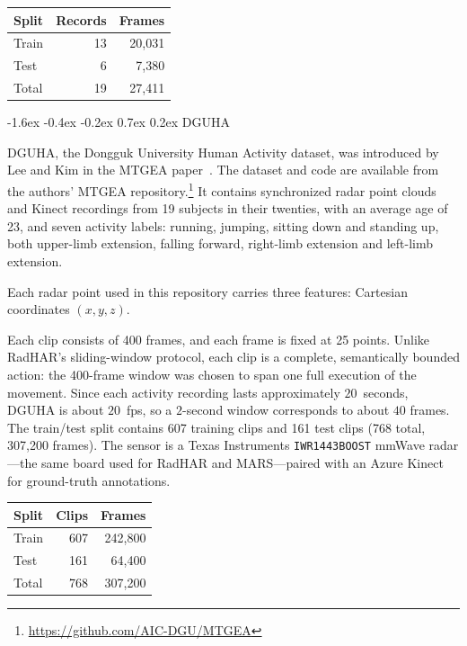 \documentclass[10pt,twocolumn]{article}
\makeatletter
\renewcommand{\subsection}{%
  \@startsection{subsection}{2}{\z@}%
  {-1.6ex \@plus -0.4ex \@minus -0.2ex}%
  {0.7ex \@plus 0.2ex}%
  {\normalfont\normalsize\bfseries}}
\makeatother
\begin{document}
\begin{center}
\begin{tabular}{lrr}
\toprule
Split & Records & Frames \\
\midrule
Train & 13 & 20,031 \\
Test & 6 & 7,380 \\
Total & 19 & 27,411 \\
\bottomrule
\end{tabular}
\end{center}

\subsection{DGUHA}
\label{sec:dguha}

DGUHA, the Dongguk University Human Activity dataset, was introduced by Lee and
Kim in the MTGEA paper~\cite{lee2023mtgea}. The dataset and code are available
from the authors' MTGEA repository.\footnote{\url{https://github.com/AIC-DGU/MTGEA}}
It contains synchronized radar point clouds and Kinect recordings from 19
subjects in their twenties, with an average age of 23, and seven activity labels: running,
jumping, sitting down and standing up, both upper-limb extension, falling
forward, right-limb extension and left-limb extension.

Each radar point used in this repository carries three features: Cartesian
coordinates $(x,y,z)$.

Each clip consists of 400 frames, and each frame is fixed at 25 points.
Unlike RadHAR's sliding-window protocol, each clip is a complete,
semantically bounded action: the 400-frame window was chosen to span one full
execution of the movement. Since each activity recording lasts approximately
$20$~seconds, DGUHA is about $20$~fps, so a $2$-second window corresponds to
about $40$ frames. The train/test split contains 607 training clips
and 161 test clips (768 total, 307,200 frames). The sensor is a Texas
Instruments \texttt{IWR1443BOOST} mmWave radar---the same board used for
RadHAR and MARS---paired with an Azure Kinect for ground-truth annotations.

\begin{center}
\begin{tabular}{lrr}
\toprule
Split & Clips & Frames \\
\midrule
Train & 607 & 242,800 \\
Test & 161 & 64,400 \\
Total & 768 & 307,200 \\
\bottomrule
\end{tabular}
\end{center}
\end{document}
